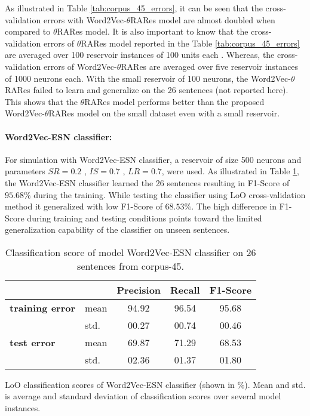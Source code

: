 As illustrated in Table \ref{tab:corpus_45_errors}, it can be seen that the cross-validation errors with Word2Vec-$\theta$RARes model are almost doubled when compared to $\theta$RARes model. It is also important to know that the cross-validation errors of $\theta$RARes model reported in the Table \ref{tab:corpus_45_errors} are averaged over 100 reservoir instances of 100 units each \cite{xavier:2013:RT}. Whereas, the cross-validation errors of Word2Vec-$\theta$RARes are averaged over five reservoir instances of 1000 neurons each. With the small reservoir of 100 neurons, the Word2Vec-$\theta$RARes failed to learn and generalize on the 26 sentences (not reported here). This shows that the $\theta$RARes model performs better than the proposed Word2Vec-$\theta$RARes model on the small dataset even with a small reservoir.

\paragraph{Word2Vec-ESN classifier:} For simulation with Word2Vec-ESN classifier, a reservoir of size 500 neurons and parameters $SR = 0.2 $ , $IS = 0.7$ , $ LR = 0.7$, were used. As illustrated in Table \ref{tab:corpus_45_scores}, the Word2Vec-ESN classifier learned the 26 sentences resulting in F1-Score of $95.68\%$ during the training. While testing the classifier using LoO cross-validation method it generalized with low F1-Score of $68.53\%$. The high difference in F1-Score during training and testing conditions points toward the limited generalization capability of the classifier on unseen sentences. 

\begin{table}[htbp]
\centering
\begin{threeparttable}
\caption[Generalization score with Word2Vec-ESN classifier on limited number of sentences.]{Classification score of model Word2Vec-ESN classifier on 26 sentences from corpus-45.}
\label{tab:corpus_45_scores}
\begin{tabular}{llccc}
\toprule
                   &              &  Precision         & Recall    & F1-Score\\
\midrule                
\textbf{training error}    & mean         & 94.92              & 96.54     & 95.68  \\
                & std.         & 00.27             & 00.74      & 00.46  \\
\textbf{test error}    & mean         & 69.87              & 71.29      & 68.53 \\
                & std.         & 02.36             & 01.37     & 01.80  \\
\bottomrule
\end{tabular}
\begin{tablenotes}
\small
\item 
LoO classification scores of Word2Vec-ESN classifier (shown in \%). Mean and std. is average and standard deviation of classification scores over several model instances.
\end{tablenotes}
\end{threeparttable}
\end{table}


